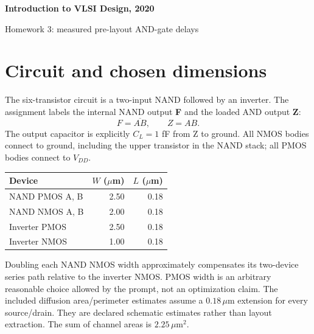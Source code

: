 \documentclass[11pt]{article}
\newcommand{\mos}[4]{\begin{scope}[shift={(#1,#2)}]
\draw (0,.24)--(0,-.24);
\draw (0,.20)--(.25,.20)--(.25,.5);
\draw (0,-.20)--(.25,-.20)--(.25,-.5);
\draw (-.16,.23)--(-.16,-.23);
\ifnum#4=1\draw (-.26,0) circle (.06);\draw (-.75,0)--(-.32,0);\else\draw (-.75,0)--(-.16,0);\fi
\node[anchor=east,font=\small] at (-.76,0) {$#3$};
\end{scope}}
\newcommand{\ground}[2]{\draw (#1,#2)--(#1,{#2-.12});\draw ({#1-.17},{#2-.12})--({#1+.17},{#2-.12});\draw ({#1-.11},{#2-.20})--({#1+.11},{#2-.20});}
\newcommand{\rail}[3]{\draw (#1,#2)--(#1,{#2+.15});\node[above,font=\small] at (#1,{#2+.15}) {$#3$};}
\newcommand{\outputnode}[3]{\fill (#1,#2) circle (.04);\draw (#1,#2)--({#1+.7},#2) node[right] {$#3$};}
\begin{document}
\begin{center}{\Large\bfseries Introduction to VLSI Design, 2020}\par{\large Homework 3: measured pre-layout AND-gate delays}\end{center}
\section*{Circuit and chosen dimensions}
The six-transistor circuit is a two-input NAND followed by an inverter. The assignment labels the internal NAND output \textbf{F} and the loaded AND output \textbf{Z}:
\[
 F=\overline{AB},\qquad Z=AB.
\]
The output capacitor is explicitly $C_L=1$ fF from Z to ground. All NMOS bodies connect to ground, including the upper transistor in the NAND stack; all PMOS bodies connect to $V_{DD}$.
\begin{center}\end{center}
\begin{center}\begin{tabular}{lrr}\toprule Device&$W$ ($\mu$m)&$L$ ($\mu$m)\\\midrule
NAND PMOS A, B&2.50&0.18\\NAND NMOS A, B&2.00&0.18\\Inverter PMOS&2.50&0.18\\Inverter NMOS&1.00&0.18\\\bottomrule\end{tabular}\end{center}
Doubling each NAND NMOS width approximately compensates its two-device series path relative to the inverter NMOS. PMOS width is an arbitrary reasonable choice allowed by the prompt, not an optimization claim. The included diffusion area/perimeter estimates assume a $0.18\,\mu$m extension for every source/drain. They are declared schematic estimates rather than layout extraction. The sum of channel areas is $2.25\,\mu\mathrm{m}^2$.
\end{document}
